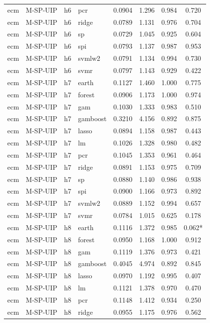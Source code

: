 \begin{ThreePartTable}
\begin{longtable}[t]{llclcccc}
ecm & M-SP-UIP & h6 & pcr & 0.0904 & 1.296 & 0.984 & 0.720\\
ecm & M-SP-UIP & h6 & ridge & 0.0789 & 1.131 & 0.976 & 0.704\\
ecm & M-SP-UIP & h6 & sp & 0.0729 & 1.045 & 0.925 & 0.604\\
ecm & M-SP-UIP & h6 & spi & 0.0793 & 1.137 & 0.987 & 0.953\\
ecm & M-SP-UIP & h6 & svmlw2 & 0.0791 & 1.134 & 0.994 & 0.730\\
ecm & M-SP-UIP & h6 & svmr & 0.0797 & 1.143 & 0.929 & 0.422\\
\addlinespace
ecm & M-SP-UIP & h7 & earth & 0.1127 & 1.460 & 1.000 & 0.775\\
ecm & M-SP-UIP & h7 & forest & 0.0906 & 1.173 & 1.000 & 0.974\\
ecm & M-SP-UIP & h7 & gam & 0.1030 & 1.333 & 0.983 & 0.510\\
ecm & M-SP-UIP & h7 & gamboost & 0.3210 & 4.156 & 0.892 & 0.875\\
ecm & M-SP-UIP & h7 & lasso & 0.0894 & 1.158 & 0.987 & 0.443\\
ecm & M-SP-UIP & h7 & lm & 0.1026 & 1.328 & 0.980 & 0.482\\
ecm & M-SP-UIP & h7 & pcr & 0.1045 & 1.353 & 0.961 & 0.464\\
ecm & M-SP-UIP & h7 & ridge & 0.0891 & 1.153 & 0.975 & 0.709\\
ecm & M-SP-UIP & h7 & sp & 0.0880 & 1.140 & 0.986 & 0.938\\
ecm & M-SP-UIP & h7 & spi & 0.0900 & 1.166 & 0.973 & 0.892\\
ecm & M-SP-UIP & h7 & svmlw2 & 0.0889 & 1.152 & 0.994 & 0.657\\
ecm & M-SP-UIP & h7 & svmr & 0.0784 & 1.015 & 0.625 & 0.178\\
\addlinespace
ecm & M-SP-UIP & h8 & earth & 0.1116 & 1.372 & 0.985 & 0.062*\\
ecm & M-SP-UIP & h8 & forest & 0.0950 & 1.168 & 1.000 & 0.912\\
ecm & M-SP-UIP & h8 & gam & 0.1119 & 1.376 & 0.973 & 0.421\\
ecm & M-SP-UIP & h8 & gamboost & 0.4045 & 4.974 & 0.892 & 0.845\\
ecm & M-SP-UIP & h8 & lasso & 0.0970 & 1.192 & 0.995 & 0.407\\
ecm & M-SP-UIP & h8 & lm & 0.1121 & 1.378 & 0.970 & 0.470\\
ecm & M-SP-UIP & h8 & pcr & 0.1148 & 1.412 & 0.934 & 0.250\\
ecm & M-SP-UIP & h8 & ridge & 0.0955 & 1.175 & 0.976 & 0.562\\

\end{longtable}
\end{ThreePartTable}
